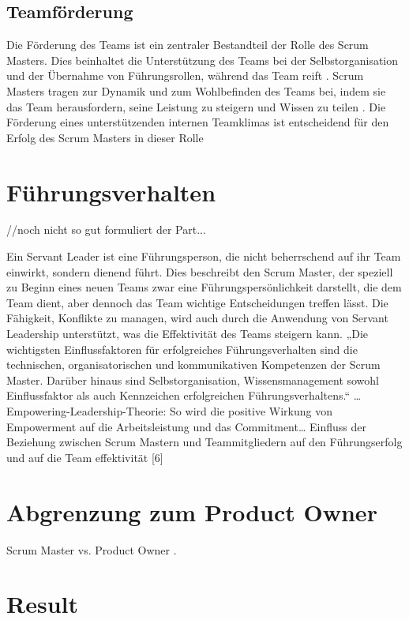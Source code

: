 \documentclass[5pt, final]{beamer}
\begin{document}
\begin{frame}[t]
\begin{multicols}{3}
			\subsection{Teamförderung}
			
			Die Förderung des Teams ist ein zentraler Bestandteil der Rolle des Scrum Masters. Dies beinhaltet die Unterstützung des Teams bei der Selbstorganisation und der Übernahme von Führungsrollen, während das Team reift \cite{?}. Scrum Masters tragen zur Dynamik und zum Wohlbefinden des Teams bei, indem sie das Team herausfordern, seine Leistung zu steigern und Wissen zu teilen \cite{?}. Die Förderung eines unterstützenden internen Teamklimas ist entscheidend für den Erfolg des Scrum Masters in dieser Rolle\cite{?}
			
			\section {Führungsverhalten}
			
			//noch nicht so gut formuliert der Part...
			
			Ein Servant Leader ist eine Führungsperson, die nicht beherrschend auf ihr Team einwirkt, sondern dienend führt. Dies beschreibt den Scrum Master, der speziell zu Beginn eines neuen Teams zwar eine Führungspersönlichkeit darstellt, die dem Team dient, aber dennoch das Team wichtige Entscheidungen treffen lässt. Die Fähigkeit, Konflikte zu managen, wird auch durch die Anwendung von Servant Leadership unterstützt, was die Effektivität des Teams steigern kann.
			„Die wichtigsten Einflussfaktoren für erfolgreiches Führungsverhalten sind die technischen, organisatorischen und kommunikativen Kompetenzen der Scrum Master. Darüber hinaus sind Selbstorganisation, Wissensmanagement sowohl Einflussfaktor als auch Kennzeichen erfolgreichen Führungsverhaltens.“ … Empowering-Leadership-Theorie: So wird die positive Wirkung von Empowerment auf die Arbeitsleistung und das Commitment… Einfluss der Beziehung zwischen Scrum Mastern und Teammitgliedern auf den Führungserfolg und auf die Team effektivität [6]
						
			
			\section{Abgrenzung zum Product Owner}
			
			Scrum Master vs. Product Owner \cite{me-company}.
			
			\section{Result}
			

\end{multicols}
\end{frame}
\end{document}

